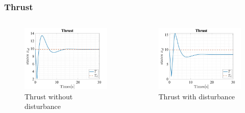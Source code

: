 \documentclass{beamer}
\begin{document}
\begin{frame}
    \frametitle{Thrust}

    \begin{columns}

        \begin{figure}[h]
            \centering
            \includegraphics[width=1\textwidth]{Thrust_T_Servo.jpg}
            \caption{Thrust without disturbance}
        \end{figure}

        \begin{figure}[h]
            \centering
            \includegraphics[width=1\textwidth]{Thrust_T_Servo_Dist.jpg}
            \caption{Thrust with disturbance}
        \end{figure}
    \end{columns}
\end{frame}
\end{document}
